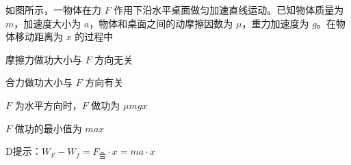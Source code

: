 如图所示，一物体在力 \( F \) 作用下沿水平桌面做匀加速直线运动。已知物体质量为 \( m \)，加速度大小为 \( a \)，物体和桌面之间的动摩擦因数为 \( \mu \)，重力加速度为 \( g \)。在物体移动距离为 \( x \) 的过程中\paren[]
	
\begin{choices}
	\item 摩擦力做功大小与 \( F \) 方向无关
	\item 合力做功大小与 \( F \) 方向有关
	\item \( F \) 为水平方向时，\( F \) 做功为 \( \mu mgx \)
	\item \( F \) 做功的最小值为 \( max  \)
\end{choices}
\begin{answer}
	D\qquad 提示：\(W_F - W_f = F _{\text{合}}\cdot x =ma\cdot x\)
\end{answer}